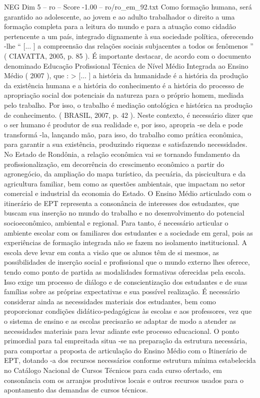 \begin{textsample}{NEG Dim 5 – ro – Score -1.00 – ro/ro\_em\_92.txt}
Como formação humana, será garantido ao adolescente, ao jovem e ao adulto trabalhador o direito a uma formação completa para a leitura do mundo e para a atuação como cidadão pertencente a um país, integrado dignamente à sua sociedade política, oferecendo -lhe “ [... ] a compreensão das relações sociais subjacentes a todos os fenômenos ” ( CIAVATTA, 2005, p. 85 ).
É importante destacar, de acordo com o documento denominado Educação Profissional Técnica de Nível Médio Integrada ao Ensino Médio ( 2007 ), que : > [... ] a história da humanidade é a história da produção da existência humana e a história do conhecimento é a história do processo de apropriação social dos potenciais da natureza para o próprio homem, mediada pelo trabalho.
Por isso, o trabalho é mediação ontológica e histórica na produção de conhecimento. ( BRASIL, 2007, p. 42 ).
Neste contexto, é necessário dizer que o ser humano é produtor de sua realidade e, por isso, apropria -se dela e pode transformá -la, lançando mão, para isso, do trabalho como prática econômica, para garantir a sua existência, produzindo riquezas e satisfazendo necessidades.
No Estado de Rondônia, a relação econômica vai se tornando fundamento da profissionalização, em decorrência do crescimento econômico a partir do agronegócio, da ampliação do mapa turístico, da pecuária, da piscicultura e da agricultura familiar, bem como as questões ambientais, que impactam no setor comercial e industrial da economia do Estado.
O Ensino Médio articulado com o itinerário de EPT representa a consonância de interesses dos estudantes, que buscam sua inserção no mundo do trabalho e no desenvolvimento do potencial socioeconômico, ambiental e regional.
Para tanto, é necessário articular o ambiente escolar com os familiares dos estudantes e a sociedade em geral, pois as experiências de formação integrada não se fazem no isolamento institucional.
A escola deve levar em conta a visão que os alunos têm de si mesmos, as possibilidades de inserção social e profissional que o mundo externo lhes oferece, tendo como ponto de partida as modalidades formativas oferecidas pela escola.
Isso exige um processo de diálogo e de conscientização dos estudantes e de suas famílias sobre as próprias expectativas e sua possível realização.
É necessário considerar ainda as necessidades materiais dos estudantes, bem como proporcionar condições didático-pedagógicas às escolas e aos professores, vez que o sistema de ensino e as escolas precisarão se adaptar de modo a atender as necessidades materiais para levar adiante este processo educacional.
O ponto primordial para tal empreitada situa -se na preparação da estrutura necessária, para comportar a proposta de articulação do Ensino Médio com o Itinerário de EPT, dotando -a dos recursos necessários conforme estrutura mínima estabelecida no Catálogo Nacional de Cursos Técnicos para cada curso ofertado, em consonância com os arranjos produtivos locais e outros recursos usados para o apontamento das demandas de cursos técnicos.

\end{textsample}
